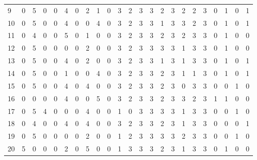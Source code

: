 \begin{table}[htbp]
{\begin{tabular}{lllllllllllllllllllllll}
9                   & 0 & 5 & 0 & 0 & 4 & 0 & 2 & 1 & 0 & 3 & 2 & 3 & 3 & 2 & 3 & 2 & 2 & 3 & 0                  & 1                   & 0                   & 1                   \\
10                  & 0 & 5 & 0 & 0 & 4 & 0 & 0 & 4 & 0 & 3 & 2 & 3 & 3 & 1 & 3 & 3 & 2 & 3 & 0                  & 1                   & 0                   & 1                   \\
11                  & 0 & 4 & 0 & 0 & 5 & 0 & 1 & 0 & 0 & 3 & 2 & 3 & 3 & 2 & 3 & 2 & 3 & 3 & 0                  & 1                   & 0                   & 0                   \\
12                  & 0 & 5 & 0 & 0 & 0 & 0 & 2 & 0 & 0 & 3 & 2 & 3 & 3 & 3 & 3 & 1 & 3 & 3 & 0                  & 1                   & 0                   & 0                   \\
13                  & 0 & 5 & 0 & 0 & 4 & 0 & 2 & 0 & 0 & 3 & 2 & 3 & 3 & 1 & 3 & 1 & 3 & 3 & 0                  & 1                   & 0                   & 1                   \\
14                  & 0 & 5 & 0 & 0 & 1 & 0 & 0 & 4 & 0 & 3 & 2 & 3 & 3 & 2 & 3 & 1 & 1 & 3 & 0                  & 1                   & 0                   & 1                   \\
15                  & 0 & 5 & 0 & 0 & 4 & 0 & 4 & 0 & 0 & 3 & 2 & 3 & 3 & 2 & 3 & 0 & 3 & 3 & 0                  & 0                   & 1                   & 0                   \\
16                  & 0 & 0 & 0 & 0 & 4 & 0 & 0 & 5 & 0 & 3 & 2 & 3 & 3 & 2 & 3 & 3 & 2 & 3 & 1                  & 1                   & 0                   & 0                   \\
17                  & 0 & 5 & 4 & 0 & 0 & 0 & 4 & 0 & 0 & 1 & 0 & 3 & 3 & 3 & 3 & 1 & 3 & 3 & 0                  & 0                   & 1                   & 0                   \\
18                  & 0 & 4 & 0 & 0 & 4 & 0 & 4 & 0 & 0 & 3 & 2 & 3 & 3 & 2 & 3 & 1 & 3 & 3 & 0                  & 0                   & 0                   & 1                   \\
19                  & 0 & 5 & 0 & 0 & 0 & 0 & 2 & 0 & 0 & 1 & 2 & 3 & 3 & 3 & 3 & 2 & 3 & 3 & 0                  & 0                   & 1                   & 0                   \\
20                  & 5 & 0 & 0 & 0 & 2 & 0 & 5 & 0 & 0 & 1 & 3 & 3 & 3 & 2 & 3 & 1 & 3 & 3 & 0                  & 1                   & 0                   & 0                   \\

\end{tabular}}
\end{table}
